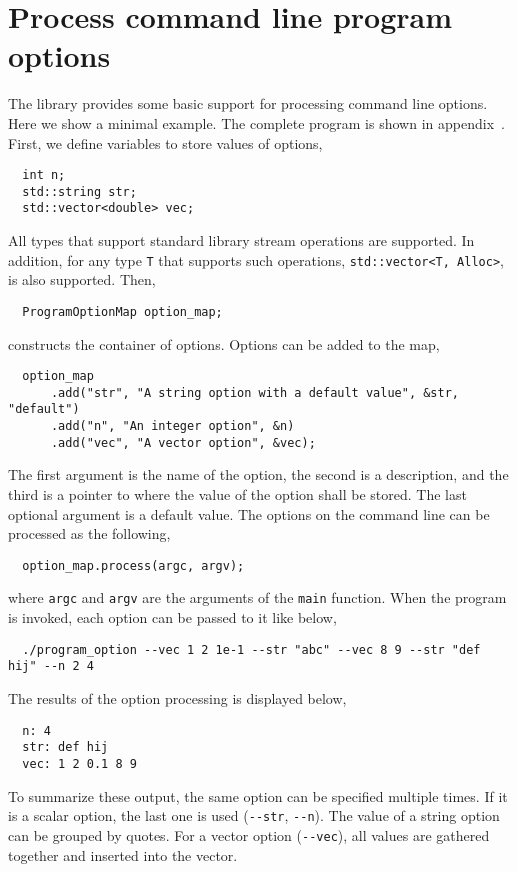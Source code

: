 \section{Process command line program options}
\label{sec:Process command line program options}

The library provides some basic support for processing command line options.
Here we show a minimal example. The complete program is shown in
appendix~. First, we
define variables to store values of options,
\begin{Verbatim}
  int n;
  std::string str;
  std::vector<double> vec;
\end{Verbatim}
All types that support standard library \io stream operations are supported. In
addition, for any type \verb|T| that supports such operations,
\verb|std::vector<T, Alloc>|, is also supported. Then,
\begin{Verbatim}
  ProgramOptionMap option_map;
\end{Verbatim}
constructs the container of options. Options can be added to the map,
\begin{Verbatim}
  option_map
      .add("str", "A string option with a default value", &str, "default")
      .add("n", "An integer option", &n)
      .add("vec", "A vector option", &vec);
\end{Verbatim}
The first argument is the name of the option, the second is a description, and
the third is a pointer to where the value of the option shall be stored. The
last optional argument is a default value. The options on the command line can
be processed as the following,
\begin{Verbatim}
  option_map.process(argc, argv);
\end{Verbatim}
where \verb|argc| and \verb|argv| are the arguments of the \verb|main|
function. When the program is invoked, each option can be passed to it like
below,
\begin{Verbatim}
  ./program_option --vec 1 2 1e-1 --str "abc" --vec 8 9 --str "def hij" --n 2 4
\end{Verbatim}
The results of the option processing is displayed below,
\begin{Verbatim}
  n: 4
  str: def hij
  vec: 1 2 0.1 8 9
\end{Verbatim}
To summarize these output, the same option can be specified multiple times. If
it is a scalar option, the last one is used (\verb|--str|, \verb|--n|). The
value of a string option can be grouped by quotes. For a vector option
(\verb|--vec|), all values are gathered together and inserted into the vector.

